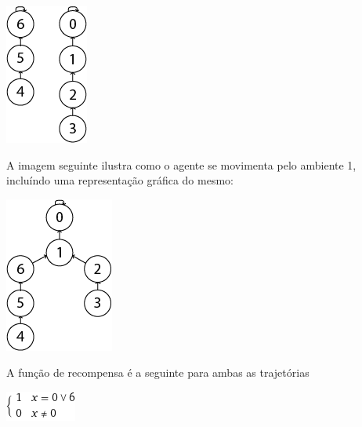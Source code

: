 \documentclass[11pt,twocolumn]{article}
\begin{document}
\begin{center}
    \includegraphics[scale=0.4]{Trajetoria1.png}
\end{center}

\par A imagem seguinte ilustra como o agente se movimenta pelo ambiente 1, incluíndo uma representação gráfica do mesmo:



\begin{center}
    \includegraphics[scale=0.4]{Trajetoria2.png}
\end{center}

A função de recompensa é a seguinte para ambas as trajetórias 

\begin{center}
    \includegraphics[scale=0.6]{piece1.png}
\end{center}
\end{document}

